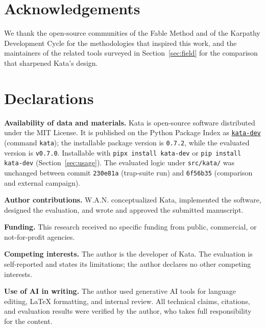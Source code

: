 \documentclass[11pt]{article}
\begin{document}
\section*{Acknowledgements}

We thank the open-source communities of the Fable Method \cite{fable} and of
the Karpathy Development Cycle \cite{karpathy} for the methodologies that
inspired this work, and the maintainers of the related tools surveyed in
Section~\ref{sec:field} for the comparison that sharpened Kata's design.

\section*{Declarations}

\noindent\textbf{Availability of data and materials.}
Kata is open-source software distributed under the MIT License. It is
published on the Python Package Index as
\href{https://pypi.org/project/kata-dev/}{\texttt{kata-dev}} (command
\texttt{kata}); the installable package version is \texttt{0.7.2}, while
the evaluated version is \texttt{v0.7.0}. Installable with \texttt{pipx install kata-dev} or \texttt{pip install
kata-dev} (Section~\ref{sec:usage}). The evaluated logic under
\texttt{src/kata/} was unchanged between commit \texttt{230e81a}
(trap-suite run) and \texttt{6f56b35} (comparison and external campaign).

\noindent\textbf{Author contributions.}
W.A.N. conceptualized Kata, implemented the software, designed the
evaluation, and wrote and approved the submitted manuscript.

\noindent\textbf{Funding.}
This research received no specific funding from public, commercial, or
not-for-profit agencies.

\noindent\textbf{Competing interests.}
The author is the developer of Kata. The evaluation is self-reported
and states its limitations; the author declares no other competing interests.

\noindent\textbf{Use of AI in writing.}
The author used generative AI tools for language editing, \LaTeX{}
formatting, and internal review. All technical claims, citations, and evaluation
results were verified by the author, who takes full responsibility for the content.



\end{document}
